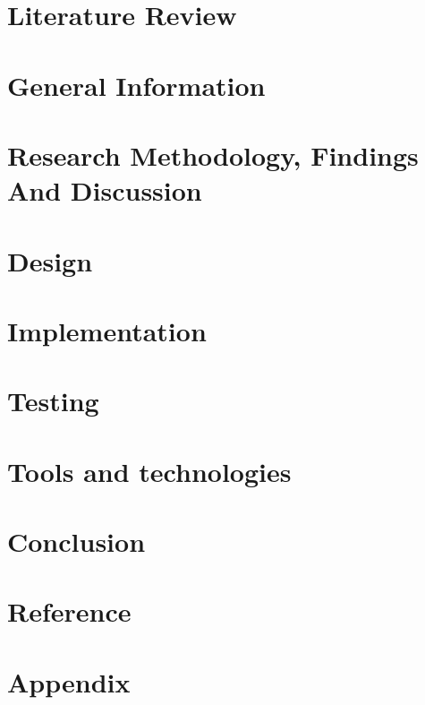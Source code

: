 \documentclass[12pt]{report}
\begin{document}
\chapter{Literature Review}


\chapter{General Information }


\chapter{Research Methodology, Findings And Discussion}


\chapter{Design}



\chapter{Implementation}



\chapter{Testing}


\chapter{Tools and technologies}



\chapter{Conclusion}


\chapter{Reference}


\chapter{Appendix}

\end{document}
